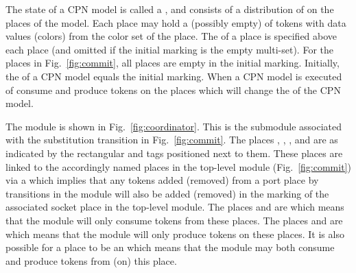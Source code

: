 
The state of a CPN model is called a , and consists
of a distribution of  on the places of the model. Each
place may hold a (possibly empty)  of tokens with
data values (colors) from the color set of the place. The
 of a place is specified above each place
(and omitted if the initial marking is the empty multi-set). For the
places in Fig.~\ref{fig:commit}, all places are empty in the initial
marking. Initially, the  of a CPN model
equals the initial marking. When a CPN model is executed
 of  consume and
produce tokens on the places which will change the  of the CPN model.

 

The  module is shown in
Fig.~\ref{fig:coordinator}. This is the submodule associated with the
 substitution transition in
Fig.~\ref{fig:commit}. The places ,
, , and  are
 as indicated by the rectangular  and
 tags positioned next to them. These places are linked to
the accordingly named places in the top-level module
(Fig.~\ref{fig:commit}) via a  which
implies that any tokens added (removed) from a port place by
transitions in the  module will also be added
(removed) in the marking of the associated socket place in the
top-level module. The places  and 
are  which means that the
 module will only consume tokens from these
places.  The places  and  are
 which means that the
 module will only produce tokens on these
places. It is also possible for a place to be an  which means that the module may both consume and produce
tokens from (on) this place.

